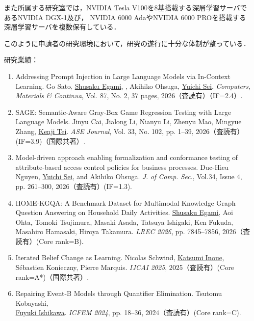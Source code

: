 \documentclass[11pt,a4j,dvipdfmx]{jarticle} 					%
\newcommand{\研究課題名}{大量の脆弱性・攻撃手段・パッチの依存関係を考慮した証明付き修正計画の自動生成}
\newcommand{\研究機関名}{電気通信大学}
\newcommand{\研究代表者氏名}{田原 康之}
\newcommand{\研究期間の最終元号年度}{12}  %
\begin{document}
また所属する研究室では，NVIDIA Tesla V100を8基搭載する深層学習サーバであるNVIDIA DGX-1及び， NVIDIA 6000 AdaやNVIDIA 6000 PROを搭載する深層学習サーバを複数保有している．

このように申請者の研究環境において，研究の遂行に十分な体制が整っている．


\vspace*{\baselineskip}

研究業績：
\begin{enumerate}
\item\label{sei26} Addressing Prompt Injection in Large Language Models via In-Context Learning.
  \setulsep{0pt} Go Sato, \ul{Shusaku Egami}, , Akihiko Ohsuga, \ul{Yuichi Sei}.
  \emph{Computers, Materials \& Continua}, Vol. 87, No. 2, 37 pages, 2026（査読有）（IF=2.4）.

\item\label{tei26} SAGE: Semantic-Aware Gray-Box Game Regression Testing with Large Language Models.
  \setulsep{0pt} Jinyu Cai, Jialong Li, Nianyu Li, Zhenyu Mao, Mingyue Zhang, \ul{Kenji Tei}.
  \emph{ASE Journal}, Vol. 33, No. 102, pp. 1--39, 2026（査読有）(IF=3.9)（国際共著）.

\item\label{tahara26} Model-driven approach enabling formalization and conformance testing of attribute-based access control policies for business processes.
  \setulsep{0pt} Duc-Hieu Nguyen, \ul{Yuichi Sei},  and Akihiko Ohsuga.
  \emph{J. of Comp. Sec.}, Vol.34, Issue 4, pp. 261--300, 2026（査読有）(IF=1.3).

\item\label{egami26} HOME-KGQA: A Benchmark Dataset for Multimodal Knowledge Graph Question Answering on Household Daily Activities.
  \setulsep{0pt} \ul{Shusaku Egami}, Aoi Ohta, Tomoki Tsujimura, Masaki Asada, Tatsuya Ishigaki, Ken Fukuda, Masahiro Hamasaki, Hiroya Takamura.
  \emph{LREC 2026}, pp. 7845--7856, 2026（査読有）(Core rank=B).

\item\label{inoue25} Iterated Belief Change as Learning.
  \setulsep{0pt} Nicolas Schwind, \ul{Katsumi Inoue}, S\'{e}bastien Konieczny, Pierre Marquis.
  {\em IJCAI 2025}, 2025（査読有）(Core rank=A*)（国際共著）.

\item\label{ishikawa24} Repairing Event-B Models through Quantifier Elimination.
  \setulsep{0pt} Tsutomu Kobayashi,\\
  \ul{Fuyuki Ishikawa}.
  \emph{ICFEM 2024}, pp. 18--36, 2024（査読有）(Core rank=C).


\end{enumerate}
\end{document}
